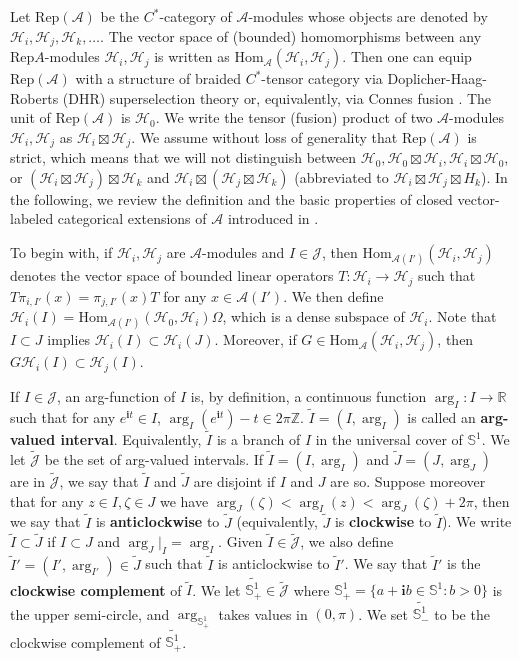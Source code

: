 \documentclass[12pt,a4paper]{article}
\theoremstyle{definition}
\theoremstyle{plain}
\newcommand{\mc}{\mathcal}
\newcommand{\wtd}{\widetilde}
\newcommand{\Hom}{\mathrm{Hom}}
\newcommand{\Rep}{\mathrm{Rep}}
\newcommand{\Jtd}{\widetilde{\mathcal J}}
\newcommand{\im}{\mathbf{i}}
\newcommand{\RepA}{\mathrm{Rep}(\mc A)}
\newcommand{\mbb}{\mathbb}
\numberwithin{equation}{subsection}
\begin{document}
Let $\RepA$ be the $C^*$-category of $\mc A$-modules whose objects are denoted by $\mc H_i,\mc H_j,\mc H_k,\dots$. The vector space of (bounded) homomorphisms between any $\Rep A$-modules  $\mc H_i,\mc H_j$ is written as $\Hom_{\mc A}(\mc H_i,\mc H_j)$. Then one can equip $\RepA$ with a structure of braided $C^*$-tensor category via Doplicher-Haag-Roberts (DHR) superselection theory \cite{FRS89,FRS92} or, equivalently, via Connes fusion \cite{Gui21a}. The unit of $\RepA$ is $\mc H_0$. We write the tensor (fusion) product of two $\mc A$-modules $\mc H_i,\mc H_j$ as $\mc H_i\boxtimes\mc H_j$. We assume without loss of generality that $\RepA$ is strict, which means that we will not distinguish between $\mc H_0,\mc H_0\boxtimes\mc H_i,\mc H_i\boxtimes\mc H_0$, or $(\mc H_i\boxtimes \mc H_j)\boxtimes\mc H_k$ and $\mc H_i\boxtimes(\mc H_j\boxtimes\mc H_k)$ (abbreviated to $\mc H_i\boxtimes\mc H_j\boxtimes H_k$). In the following, we review the definition and the basic properties of closed vector-labeled categorical extensions of $\mc A$  introduced in \cite{Gui21a}.

To begin with, if $\mc H_i,\mc H_j$ are $\mc A$-modules and $I\in\mc J$, then $\Hom_{\mc A(I')}(\mc H_i,\mc H_j)$ denotes the vector space of bounded linear operators $T:\mc H_i\rightarrow\mc H_j$ such that $T\pi_{i,I'}(x)=\pi_{j,I'}(x)T$ for any $x\in\mc A(I')$. We then define $\mc H_i(I)=\Hom_{\mc A(I')}(\mc H_0,\mc H_i)\Omega$, which is a dense subspace of $\mc H_i$. Note that $I\subset J$ implies $\mc H_i(I)\subset\mc H_i(J)$. Moreover, if $G\in\Hom_{\mc A}(\mc H_i,\mc H_j)$, then $G\mc H_i(I)\subset\mc H_j(I)$.

If $I\in\mc J$, an arg-function of $I$ is, by definition, a continuous function $\arg_I:I\rightarrow\mbb R$ such that for any $e^{\im t}\in I$, $\arg_I(e^{\im t})-t\in 2\pi\mbb Z$. $\wtd I=(I,\arg_I)$ is called an \textbf{arg-valued interval}. Equivalently, $\wtd I$ is a branch of $I$ in the universal cover of $\mbb S^1$. We let $\wtd{\mc J}$ be the set of arg-valued intervals. If $\wtd I=(I,\arg_I)$ and $\wtd J=(J,\arg_J)$ are in $\Jtd$, we say that $\wtd I$ and $\wtd J$ are disjoint if $I$ and $J$ are so. Suppose moreover that for any $z\in I,\zeta\in J$ we have $\arg_J(\zeta)<\arg_I(z)<\arg_J(\zeta)+2\pi$, then we say that $\wtd I$ is \textbf{anticlockwise} to $\wtd J$ (equivalently, $\wtd J$ is \textbf{clockwise} to $\wtd I$). We write $\wtd I\subset\wtd J$ if $I\subset J$ and $\arg_J|_I=\arg_I$. Given $\wtd I\in\Jtd$, we also define $\wtd I'=(I',\arg_{I'})\in\wtd J$ such that $\wtd I$ is anticlockwise to $\wtd I'$. We say that $\wtd I'$ is the \textbf{clockwise complement} of $\wtd I$. We let $\wtd{\mbb S^1_+}\in\Jtd$ where $\mbb S^1_+=\{a+\im b\in\mbb S^1:b>0 \}$ is the upper semi-circle, and $\arg_{\mbb S^1_+}$ takes values in $(0,\pi)$. We set $\wtd{\mbb S^1_-}$ to be the clockwise complement of $\wtd{\mbb S^1_+}$.
\end{document}
